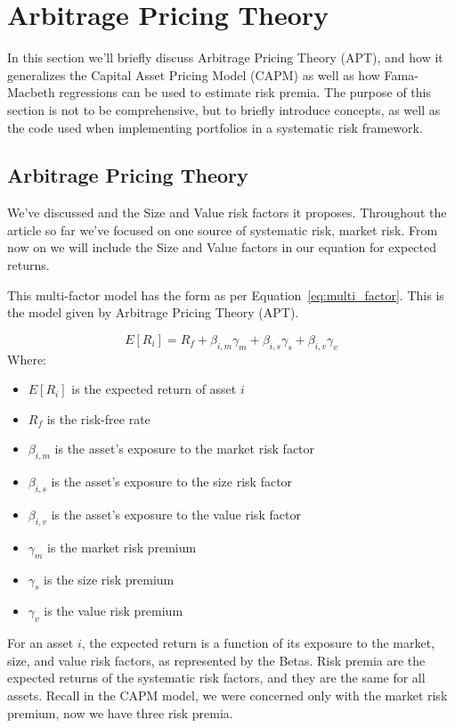 \section{Arbitrage Pricing Theory}
\label{sec:arbitrage_pricing_theory}
In this section we'll briefly discuss Arbitrage Pricing Theory (APT), and how it generalizes the Capital Asset Pricing Model (CAPM) as well as 
how Fama-Macbeth regressions can be used to estimate risk premia. The purpose of this section is not to be comprehensive,
but to briefly introduce concepts, as well as the code used when implementing portfolios in a systematic risk framework.

\subsection{Arbitrage Pricing Theory}
We've discussed \citet{fama_french_1993} and the Size and Value risk factors it proposes.
Throughout the article so far we've focused on one source of systematic risk, market risk.
From now on we will include the Size and Value factors in our equation for expected returns.

This multi-factor model has the form as per Equation~{\ref{eq:multi_factor}}. This is the model given by Arbitrage Pricing Theory (APT).

\begin{equation}
    \label{eq:multi_factor}
    E[R_i] = R_f + \beta_{i,m} \gamma_m + \beta_{i,s} \gamma_s + \beta_{i,v} \gamma_v
\end{equation}
Where:
\begin{itemize}
    \item $E[R_i]$ is the expected return of asset $i$
    \item $R_f$ is the risk-free rate
    \item $\beta_{i,m}$ is the asset's exposure to the market risk factor
    \item $\beta_{i,s}$ is the asset's exposure to the size risk factor
    \item $\beta_{i,v}$ is the asset's exposure to the value risk factor
    \item $\gamma_m$ is the market risk premium
    \item $\gamma_s$ is the size risk premium
    \item $\gamma_v$ is the value risk premium
\end{itemize}

For an asset $i$, the expected return is a function of its exposure to the market, size, and value risk factors, as represented by the Betas.
Risk premia are the expected returns of the systematic risk factors, and they are the same for all assets. Recall in the CAPM model, we were concerned only with
the market risk premium, now we have three risk premia.

